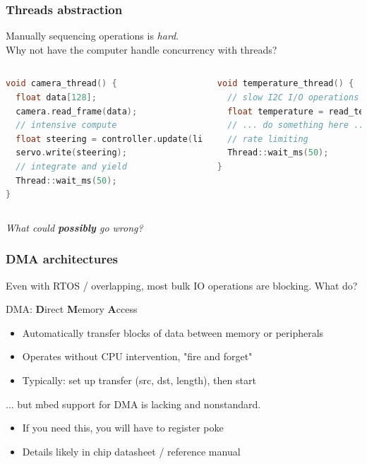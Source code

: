\documentclass{beamer}
\begin{document}
\begin{frame}[fragile]
\frametitle{Threads abstraction}
Manually sequencing operations is \textit{hard}. \\
Why not have the computer handle concurrency with threads? \\
\begin{columns}[t]
\begin{lstlisting}[language=C++,basicstyle=\ttfamily\scriptsize]
void camera_thread() {
  float data[128];
  camera.read_frame(data);
  // intensive compute
  float steering = controller.update(line_detect(data));
  servo.write(steering);
  // integrate and yield
  Thread::wait_ms(50);
}
\end{lstlisting}
\begin{lstlisting}[language=C++,basicstyle=\ttfamily\scriptsize]
void temperature_thread() {
  // slow I2C I/O operations
  float temperature = read_temperature();
  // ... do something here ...
  // rate limiting
  Thread::wait_ms(50);
}
\end{lstlisting}
\end{columns}
\textit{What could \textbf{possibly} go wrong?}
\end{frame}


\begin{frame}
\frametitle{DMA architectures}
Even with RTOS / overlapping, most bulk IO operations are blocking. What do? \\
\hfill \break
{} {
DMA: \textbf{D}irect \textbf{M}emory \textbf{A}ccess
\begin{itemize}
  \item Automatically transfer blocks of data between memory or peripherals
  \item Operates without CPU intervention, "fire and forget"
  \item Typically: set up transfer (src, dst, length), then start
\end{itemize}
\hfill \break
... but mbed support for DMA is lacking and nonstandard.
\begin{itemize}
  \item If you need this, you will have to register poke
  \item Details likely in chip datasheet / reference manual
\end{itemize}
}
\end{frame}
\end{document}
